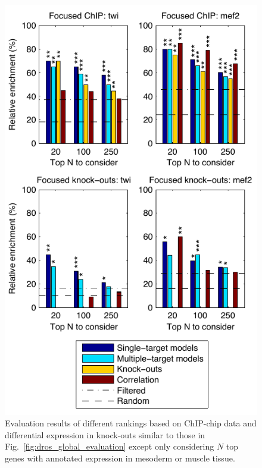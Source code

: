\documentclass{pnastwo}
\begin{document}
\begin{article}
\begin{figure}[tb]
  \centering
  \includegraphics{fig4}
  \caption{Evaluation results of different rankings based on
    ChIP-chip data and differential expression in knock-outs
    similar to those in
    Fig.~\ref{fig:dros_global_evaluation} except only considering
    $N$ top genes
    with annotated expression in mesoderm or muscle tissue.
\label{fig:dros_focused_evaluation}
}
\end{figure}


\end{article}
\end{document}
